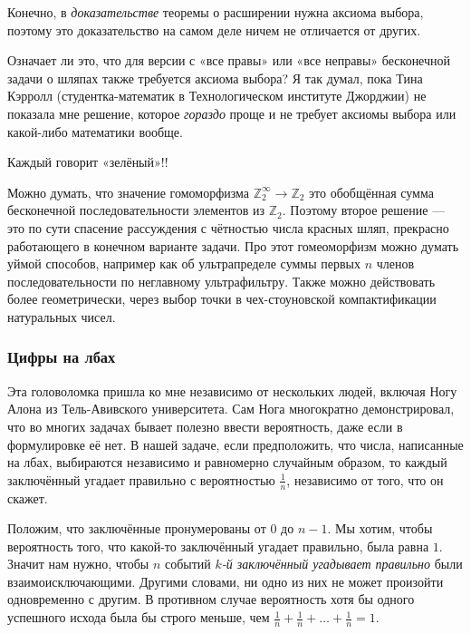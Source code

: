 Конечно, в \emph{доказательстве} теоремы о расширении нужна аксиома выбора, поэтому это доказательство на самом деле ничем не отличается от других.

Означает ли это, что для версии с «все правы» или «все неправы» бесконечной задачи о шляпах также требуется аксиома выбора?
Я так думал, пока Тина Кэрролл (студентка-математик в Технологическом институте Джорджии) не показала мне решение, которое \emph{гораздо} проще и не требует аксиомы выбора или какой-либо математики вообще.

Каждый говорит «зелёный»!!

\begin{addedbytheeditors}
Можно думать, что значение гомоморфизма $\mathbb{Z}_2^\infty\to \mathbb{Z}_2$ это обобщённая сумма бесконечной последовательности элементов из $\mathbb{Z}_2$.
Поэтому второе решение --- это по сути спасение рассуждения с чётностью числа красных шляп, прекрасно работающего в конечном варианте задачи.
Про этот гомеоморфизм можно думать уймой способов, например как об ультрапределе суммы первых $n$ членов последовательности по неглавному ультрафильтру.
Также можно действовать более геометрически, через выбор точки в чех-стоуновской компактификации натуральных чисел.\pr
\end{addedbytheeditors}


\subsubsection*{Цифры на лбах}

Эта головоломка пришла ко мне независимо от нескольких людей, включая Ногу Алона из Тель-Авивского университета.
Сам Нога многократно демонстрировал, что во многих задачах бывает полезно ввести вероятность, даже если в формулировке её нет.
В нашей задаче, если предположить, что числа, написанные на лбах, выбираются независимо и равномерно случайным образом, то каждый заключённый угадает правильно с вероятностью $\tfrac1n$, независимо от того, что он скажет.

Положим, что заключённые пронумерованы от $0$ до $n-1$.
Мы хотим, чтобы вероятность того, что какой-то заключённый угадает правильно, была равна $1$.
Значит нам нужно, чтобы $n$ событий \emph{$k$-й заключённый угадывает правильно} были взаимоисключающими.
Другими словами, ни одно из них не может произойти одновременно с другим.
В противном случае вероятность хотя бы одного успешного исхода была бы строго меньше, чем $\tfrac1n + \tfrac1n + \dots + \tfrac1n = 1$.

